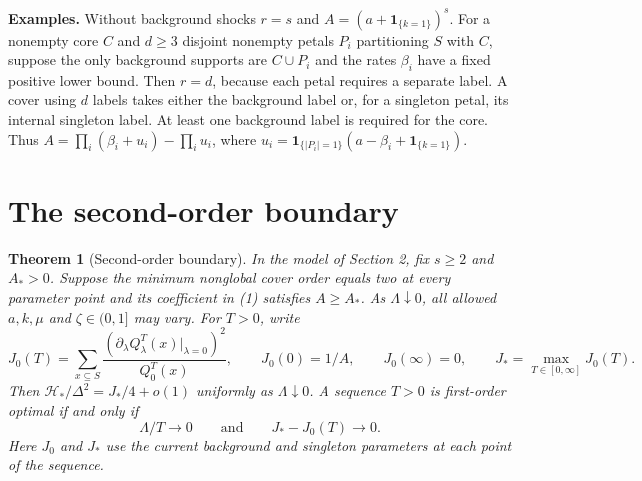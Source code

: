 \documentclass[11pt]{article}
\newtheorem{theorem}{Theorem}
\begin{document}
\textbf{Examples.} Without background shocks \(r=s\) and \(A=(a+\mathbf1_{\{k=1\}})^s\). For a nonempty core \(C\) and \(d\ge3\) disjoint nonempty petals \(P_i\) partitioning \(S\) with \(C\), suppose the only background supports are \(C\cup P_i\) and the rates \(\beta_i\) have a fixed positive lower bound. Then \(r=d\), because each petal requires a separate label. A cover using \(d\) labels takes either the background label or, for a singleton petal, its internal singleton label. At least one background label is required for the core. Thus \(A=\prod_i(\beta_i+u_i)-\prod_i u_i\), where \(u_i=\mathbf1_{\{|P_i|=1\}}(a-\beta_i+\mathbf1_{\{k=1\}})\).

\section{The second-order boundary}\label{the-second-order-boundary}

\begin{theorem}[Second-order boundary] In the model of Section 2, fix \(s\ge2\) and \(A_*>0\). Suppose the minimum nonglobal cover order equals two at every parameter point and its coefficient in (1) satisfies \(A\ge A_*\). As \(\Lambda\downarrow0\), all allowed \(a,k,\mu\) and \(\zeta\in(0,1]\) may vary. For \(T>0\), write \[
J_0(T)=\sum_{x\subseteq S}\frac{(\partial_\lambda Q_\lambda^T(x)|_{\lambda=0})^2}{Q_0^T(x)},\qquad
J_0(0)=1/A,\qquad J_0(\infty)=0,\qquad J_*=\max_{T\in[0,\infty]}J_0(T).
\] Then \(\mathcal H_*/\Delta^2=J_*/4+o(1)\) uniformly as \(\Lambda\downarrow0\). A sequence \(T>0\) is first-order optimal if and only if \[
\Lambda/T\to0\qquad\text{and}\qquad J_*-J_0(T)\to0.
\tag{10}
\] Here \(J_0\) and \(J_*\) use the current background and singleton parameters at each point of the sequence.

\end{theorem}
\end{document}
